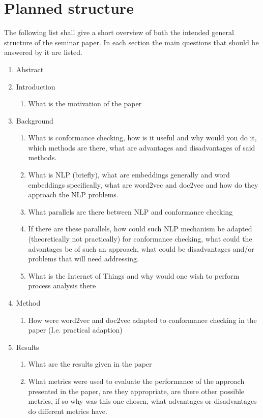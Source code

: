 \documentclass[runningheads]{template/llncs}
\begin{document}
\section{Planned structure}
The following list shall give a short overview of both the intended general structure of the seminar paper. In each section the main questions that should be answered by it are listed.
\begin{enumerate}
	\item Abstract
	\item Introduction
	\begin{enumerate}
		\item What is the motivation of the paper
	\end{enumerate}
	\item Background
	\begin{enumerate}
		\item What is conformance checking, how is it useful and why would you do it, which methods are there, what are advantages and disadvantages of said methods.
		\item What is NLP (briefly), what are embeddings generally and word embeddings specifically, what are word2vec and doc2vec and how do they approach the NLP problems.
		\item What parallels are there between NLP and conformance checking
		\item If there are these parallels, how could such NLP mechanism be adapted (theoretically not practically) for conformance checking, what could the advantages be of such an approach, what could be disadvantages and/or problems that will need addressing.
		\item What is the Internet of Things and why would one wish to perform process analysis there
	\end{enumerate}
	\item Method
	\begin{enumerate}
		\item How were word2vec and doc2vec adapted to conformance checking in the paper (I.e. practical adaption)
	\end{enumerate}
	\item Results
	\begin{enumerate}
		\item What are the results given in the paper
		\item What metrics were used to evaluate the performance of the approach presented in the paper, are they appropriate, are there other possible metrics, if so why was this one chosen, what advantages or disadvantages do different metrics have.

\end{enumerate}
\end{enumerate}
\end{document}
